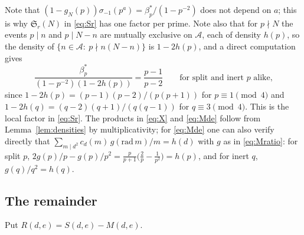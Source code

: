 \documentclass[11pt]{amsart}
\theoremstyle{remark}
\newcommand{\cA}{\mathcal{A}}
\newcommand{\Sg}{\mathfrak{S}}
\begin{document}
Note that $(1-g_N(p))\sigma_{-1}(p^a)=\beta_p^*/(1-p^{-2})$ does not depend on $a$; this is why $\Sg_r(N)$ in \eqref{eq:Sr} has one factor per prime. Note also that for $p\nmid N$ the events $p\mid n$ and $p\mid N-n$ are mutually exclusive on $\cA$, each of density $h(p)$, so the density of $\{n\in\cA:\ p\nmid n(N-n)\}$ is $1-2h(p)$, and a direct computation gives
\begin{equation}\label{eq:rho}
\frac{\beta_p^*}{(1-p^{-2})(1-2h(p))}=\frac{p-1}{p-2}\qquad\text{for split and inert $p$ alike,}
\end{equation}
since $1-2h(p)=(p-1)(p-2)/(p(p+1))$ for $p\equiv1\pmod 4$ and $1-2h(q)=(q-2)(q+1)/(q(q-1))$ for $q\equiv3\pmod 4$. This is the local factor in \eqref{eq:Sr}. The products in \eqref{eq:X} and \eqref{eq:Mde} follow from Lemma~\ref{lem:densities} by multiplicativity; for \eqref{eq:Mde} one can also verify directly that $\sum_{m\mid d^2}c_d(m)\,g(\mathrm{rad}\,m)/m=h(d)$ with $g$ as in \eqref{eq:Mratio}: for split $p$, $2g(p)/p-g(p)/p^2=\frac{p}{p+1}\bigl(\frac2p-\frac1{p^2}\bigr)=h(p)$, and for inert $q$, $g(q)/q^2=h(q)$.

\subsection{The remainder}
Put $R(d,e)=S(d,e)-M(d,e)$.
\end{document}
